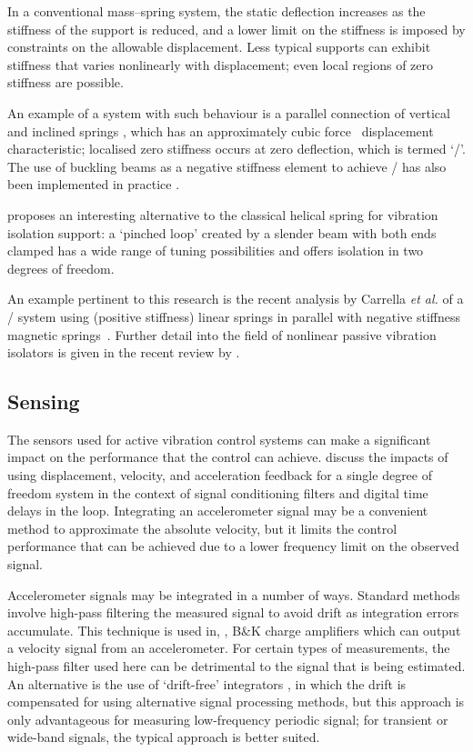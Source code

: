 In a conventional mass--spring system, the static deflection increases as the stiffness of the support is reduced, and a lower limit on the stiffness is imposed by constraints on the allowable displacement.
Less typical supports can exhibit stiffness that varies nonlinearly with displacement; even local regions of zero stiffness are possible.

An example of a system with such behaviour is a parallel connection of vertical and inclined springs \cite{molyneux1957,alabuzhev1989,carrella2006,carrella2007}, which has an approximately cubic force \vs\ displacement characteristic; localised zero stiffness occurs at zero deflection, which is termed `\qzs/'.
The use of buckling beams as a negative stiffness element to achieve \qzs/ has also been implemented in practice \cite{platus1999,tarnai2003}.

\textcite{virgin2008} proposes an interesting alternative to the classical helical spring for vibration isolation support: a `pinched loop' created by a slender beam with both ends clamped has a wide range of tuning possibilities and offers isolation in two degrees of freedom.

An example pertinent to this research is the recent analysis by Carrella \emph{et al.} of a \qzs/ system using (positive stiffness) linear springs in parallel with negative stiffness magnetic springs~\cite{carrella2008,carrella2009}.
Further detail into the field  of nonlinear passive vibration isolators is given in the recent review by \textcite{ibrahim2008}.

\subsection{Sensing}

The sensors used for active vibration control systems can make a significant impact on the performance that the control can achieve.
\textcite{brennan2007} discuss the impacts of using displacement, velocity, and acceleration feedback for a single degree of freedom system in the context of signal conditioning filters and digital time delays in the loop.
Integrating an accelerometer signal may be a convenient method to approximate the absolute velocity, but it limits the control performance that can be achieved due to a lower frequency limit on the observed signal.

Accelerometer signals may be integrated in a number of ways.
Standard methods involve high-pass filtering the measured signal to avoid drift as integration errors accumulate.
This technique is used in, \eg, B\&K charge amplifiers which can output a velocity signal from an accelerometer.
For certain types of measurements, the high-pass filter used here can be detrimental to the signal that is being estimated.
An alternative is the use of `drift-free' integrators \cite{gavin1998}, in which the drift is compensated for using alternative signal processing methods, but this approach is only advantageous for measuring low-frequency periodic signal; for transient or wide-band signals, the typical approach is better suited.

